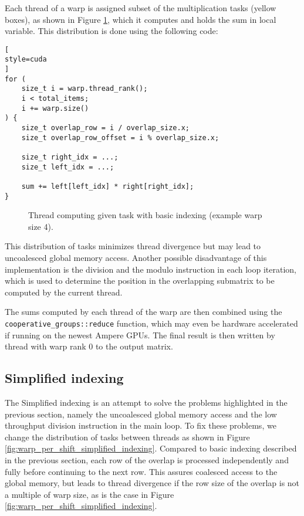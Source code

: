 Each thread of a warp is assigned subset of the multiplication tasks (yellow boxes), as shown in Figure \ref{fig:warp_per_shift_normal_indexing}, which it computes and holds the sum in local variable. This distribution is done using the following code:

\begin{lstlisting}[
style=cuda
]
for (
	size_t i = warp.thread_rank(); 
	i < total_items; 
	i += warp.size()
) {
	size_t overlap_row = i / overlap_size.x;
	size_t overlap_row_offset = i % overlap_size.x;

	size_t right_idx = ...;
	size_t left_idx = ...;

	sum += left[left_idx] * right[right_idx];
}
\end{lstlisting}

\begin{figure}[ht]
	\centering
	\def\svgwidth{0.2\textwidth}
	\fontsize{8}{10}\selectfont
	
	\caption{Thread computing given task with basic indexing (example warp size 4).}
	\label{fig:warp_per_shift_normal_indexing}
\end{figure}

This distribution of tasks minimizes thread divergence but may lead to uncoalesced global memory access. Another possible disadvantage of this implementation is the division and the modulo instruction in each loop iteration, which is used to determine the position in the overlapping submatrix to be computed by the current thread.

The sums computed by each thread of the warp are then combined using the \texttt{cooperative\_groups::reduce} function, which may even be hardware accelerated if running on the newest Ampere GPUs. The final result is then written by thread with warp rank $0$ to the output matrix. 


\subsection{Simplified indexing}

The Simplified indexing is an attempt to solve the problems highlighted in the previous section, namely the uncoalesced global memory access and the low throughput division instruction in the main loop. To fix these problems, we change the distribution of tasks between threads as shown in Figure \ref{fig:warp_per_shift_simplified_indexing}. Compared to basic indexing described in the previous section, each row of the overlap is processed independently and fully before continuing to the next row. This assures coalesced access to the global memory, but leads to thread divergence if the row size of the overlap is not a multiple of warp size, as is the case in Figure \ref{fig:warp_per_shift_simplified_indexing}.

